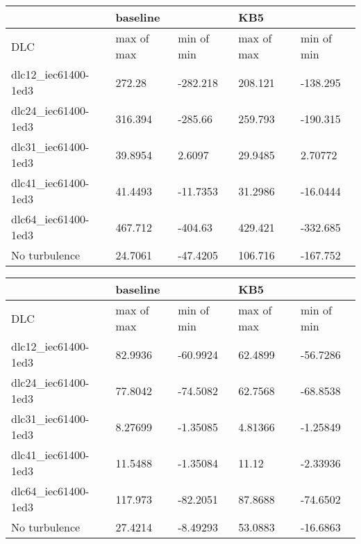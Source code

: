 \begin{tabular}{lllll}
\toprule
                     & \multicolumn{2}{l}{baseline} &         KB5 &\\
\midrule
                 DLC &  max of max &  min of min &  max of max &  min of min \\
 dlc12\_iec61400-1ed3 &      272.28 &    -282.218 &     208.121 &    -138.295 \\
 dlc24\_iec61400-1ed3 &     316.394 &     -285.66 &     259.793 &    -190.315 \\
 dlc31\_iec61400-1ed3 &     39.8954 &      2.6097 &     29.9485 &     2.70772 \\
 dlc41\_iec61400-1ed3 &     41.4493 &    -11.7353 &     31.2986 &    -16.0444 \\
 dlc64\_iec61400-1ed3 &     467.712 &     -404.63 &     429.421 &    -332.685 \\
    No turbulence &     24.7061 &    -47.4205 &     106.716 &    -167.752 \\
\bottomrule
\end{tabular}




\begin{tabular}{lllll}
\toprule
                     & \multicolumn{2}{l}{baseline} &         KB5 &\\
\midrule
                 DLC &  max of max &  min of min &  max of max &  min of min \\
 dlc12\_iec61400-1ed3 &     82.9936 &    -60.9924 &     62.4899 &    -56.7286 \\
 dlc24\_iec61400-1ed3 &     77.8042 &    -74.5082 &     62.7568 &    -68.8538 \\
 dlc31\_iec61400-1ed3 &     8.27699 &    -1.35085 &     4.81366 &    -1.25849 \\
 dlc41\_iec61400-1ed3 &     11.5488 &    -1.35084 &       11.12 &    -2.33936 \\
 dlc64\_iec61400-1ed3 &     117.973 &    -82.2051 &     87.8688 &    -74.6502 \\
    No turbulence &     27.4214 &    -8.49293 &     53.0883 &    -16.6863 \\
\bottomrule
\end{tabular}


